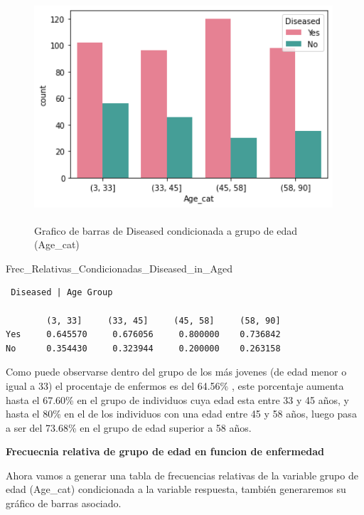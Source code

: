 \documentclass[
  11pt,
  a4paper,
]{article}
\newenvironment{Shaded}{\begin{snugshade}}{\end{snugshade}}
\newcommand{\NormalTok}[1]{#1}
\begin{document}
\begin{figure}
\centering
\includegraphics[width=4.375in,height=3.33333in]{output_187_1.png}
\caption{Grafico de barras de Diseased condicionada a grupo de edad
(Age\_cat)}
\end{figure}

\begin{Shaded}
\begin{Highlighting}[]
\NormalTok{Frec\_Relativas\_Condicionadas\_Diseased\_in\_Aged  }
\end{Highlighting}
\end{Shaded}

\begin{verbatim}
 Diseased | Age Group
 
        (3, 33]     (33, 45]     (45, 58]     (58, 90]
Yes     0.645570     0.676056     0.800000    0.736842
No      0.354430     0.323944     0.200000    0.263158
\end{verbatim}

\newpage

Como puede observarse dentro del grupo de los más jovenes (de edad menor
o igual a 33) el procentaje de enfermos es del 64.56\% , este porcentaje
aumenta hasta el 67.60\% en el grupo de individuos cuya edad esta entre
33 y 45 años, y hasta el 80\% en el de los individuos con una edad entre
45 y 58 años, luego pasa a ser del 73.68\% en el grupo de edad superior
a 58 años.

\vspace{1cm}

\textbf{Frecuecnia relativa de grupo de edad en funcion de enfermedad}

Ahora vamos a generar una tabla de frecuencias relativas de la variable
grupo de edad (Age\_cat) condicionada a la variable respuesta, también
generaremos su gráfico de barras asociado.
\end{document}

